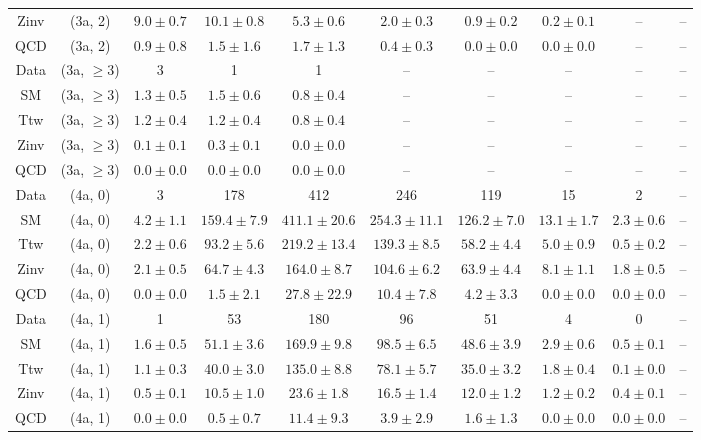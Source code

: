 \begin{table}[h!]
{\begin{tabular}{cccccccccc}
	Zinv & (3a, 2) & $9.0\pm 0.7$ & $10.1\pm 0.8$ & $5.3\pm 0.6$ & $2.0\pm 0.3$ & $0.9\pm 0.2$ & $0.2\pm 0.1$ & -- & -- \\[0.5ex] 
	QCD & (3a, 2) & $0.9\pm 0.8$ & $1.5\pm 1.6$ & $1.7\pm 1.3$ & $0.4\pm 0.3$ & $0.0\pm 0.0$ & $0.0\pm 0.0$ & -- & -- \\[0.5ex] 
	Data & (3a, $\ge3$) & 3 & 1 & 1 & -- & -- & -- & -- & -- \\[0.5ex] 
	SM & (3a, $\ge3$) & $1.3\pm 0.5$ & $1.5\pm 0.6$ & $0.8\pm 0.4$ & -- & -- & -- & -- & -- \\[0.5ex] 
	Ttw & (3a, $\ge3$) & $1.2\pm 0.4$ & $1.2\pm 0.4$ & $0.8\pm 0.4$ & -- & -- & -- & -- & -- \\[0.5ex] 
	Zinv & (3a, $\ge3$) & $0.1\pm 0.1$ & $0.3\pm 0.1$ & $0.0\pm 0.0$ & -- & -- & -- & -- & -- \\[0.5ex] 
	QCD & (3a, $\ge3$) & $0.0\pm 0.0$ & $0.0\pm 0.0$ & $0.0\pm 0.0$ & -- & -- & -- & -- & -- \\[0.5ex] 
	Data & (4a, 0) & 3 & 178 & 412 & 246 & 119 & 15 & 2 & -- \\[0.5ex] 
	SM & (4a, 0) & $4.2\pm 1.1$ & $159.4\pm 7.9$ & $411.1\pm 20.6$ & $254.3\pm 11.1$ & $126.2\pm 7.0$ & $13.1\pm 1.7$ & $2.3\pm 0.6$ & -- \\[0.5ex] 
	Ttw & (4a, 0) & $2.2\pm 0.6$ & $93.2\pm 5.6$ & $219.2\pm 13.4$ & $139.3\pm 8.5$ & $58.2\pm 4.4$ & $5.0\pm 0.9$ & $0.5\pm 0.2$ & -- \\[0.5ex] 
	Zinv & (4a, 0) & $2.1\pm 0.5$ & $64.7\pm 4.3$ & $164.0\pm 8.7$ & $104.6\pm 6.2$ & $63.9\pm 4.4$ & $8.1\pm 1.1$ & $1.8\pm 0.5$ & -- \\[0.5ex] 
	QCD & (4a, 0) & $0.0\pm 0.0$ & $1.5\pm 2.1$ & $27.8\pm 22.9$ & $10.4\pm 7.8$ & $4.2\pm 3.3$ & $0.0\pm 0.0$ & $0.0\pm 0.0$ & -- \\[0.5ex] 
	Data & (4a, 1) & 1 & 53 & 180 & 96 & 51 & 4 & 0 & -- \\[0.5ex] 
	SM & (4a, 1) & $1.6\pm 0.5$ & $51.1\pm 3.6$ & $169.9\pm 9.8$ & $98.5\pm 6.5$ & $48.6\pm 3.9$ & $2.9\pm 0.6$ & $0.5\pm 0.1$ & -- \\[0.5ex] 
	Ttw & (4a, 1) & $1.1\pm 0.3$ & $40.0\pm 3.0$ & $135.0\pm 8.8$ & $78.1\pm 5.7$ & $35.0\pm 3.2$ & $1.8\pm 0.4$ & $0.1\pm 0.0$ & -- \\[0.5ex] 
	Zinv & (4a, 1) & $0.5\pm 0.1$ & $10.5\pm 1.0$ & $23.6\pm 1.8$ & $16.5\pm 1.4$ & $12.0\pm 1.2$ & $1.2\pm 0.2$ & $0.4\pm 0.1$ & -- \\[0.5ex] 
	QCD & (4a, 1) & $0.0\pm 0.0$ & $0.5\pm 0.7$ & $11.4\pm 9.3$ & $3.9\pm 2.9$ & $1.6\pm 1.3$ & $0.0\pm 0.0$ & $0.0\pm 0.0$ & -- \\[0.5ex] 

\end{tabular}}
\end{table}

